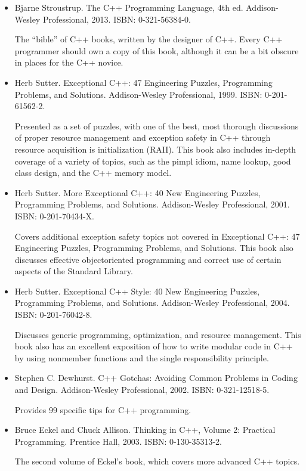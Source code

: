 \begin{itemize}
\item
Bjarne Stroustrup. The C++ Programming Language, 4th ed. Addison-Wesley Professional, 2013. ISBN: 0-321-56384-0.

The “bible” of C++ books, written by the designer of C++. Every C++ programmer should own a copy of this book, although it can be a bit obscure in places for the C++ novice.

\item
Herb Sutter. Exceptional C++: 47 Engineering Puzzles, Programming Problems, and Solutions. Addison-Wesley Professional, 1999. ISBN: 0-201-61562-2.

Presented as a set of puzzles, with one of the best, most thorough discussions of proper resource management and exception safety in C++ through resource acquisition is initialization (RAII). This book also includes in-depth coverage of a variety of topics, such as the pimpl idiom, name lookup, good class design, and the C++ memory model.

\item
Herb Sutter. More Exceptional C++: 40 New Engineering Puzzles, Programming Problems, and Solutions. Addison-Wesley Professional, 2001. ISBN: 0-201-70434-X.

Covers additional exception safety topics not covered in Exceptional C++: 47 Engineering Puzzles, Programming Problems, and Solutions. This book also discusses effective objectoriented programming and correct use of certain aspects of the Standard Library.

\item
Herb Sutter. Exceptional C++ Style: 40 New Engineering Puzzles, Programming Problems, and Solutions. Addison-Wesley Professional, 2004. ISBN: 0-201-76042-8.

Discusses generic programming, optimization, and resource management. This book also has an excellent exposition of how to write modular code in C++ by using nonmember functions and the single responsibility principle.

\item
Stephen C. Dewhurst. C++ Gotchas: Avoiding Common Problems in Coding and Design. Addison-Wesley Professional, 2002. ISBN: 0-321-12518-5.

Provides 99 specific tips for C++ programming.

\item
Bruce Eckel and Chuck Allison. Thinking in C++, Volume 2: Practical Programming. Prentice Hall, 2003. ISBN: 0-130-35313-2.

The second volume of Eckel’s book, which covers more advanced C++ topics.


\end{itemize}
